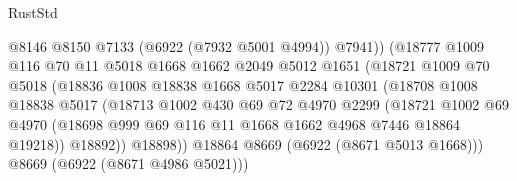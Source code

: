 \begin{lexlean}{RustStd}
\begin{coremodule}
                                  @8146
                                  @8150
                                  @7133
                                  (@6922 (@7932 @5001 @4994))
                                  @7941))
                              (@18777
                                @1009
                                @116
                                @70
                                @11
                                @5018
                                @1668
                                @1662
                                @2049
                                @5012
                                @1651
                                (@18721
                                  @1009
                                  @70
                                  @5018
                                  (@18836
                                    @1008
                                    @18838
                                    @1668
                                    @5017
                                    @2284
                                    @10301
                                    (@18708
                                      @1008
                                      @18838
                                      @5017
                                      (@18713
                                        @1002
                                        @430
                                        @69
                                        @72
                                        @4970
                                        @2299
                                        (@18721
                                          @1002
                                          @69
                                          @4970
                                          (@18698
                                            @999
                                            @69
                                            @116
                                            @11
                                            @1668
                                            @1662
                                            @4968
                                            @7446
                                            @18864
                                            @19218))
                                        @18892))
                                    @18898))
                                @18864
                                @8669
                                (@6922 (@8671 @5013 @1668)))
                              @8669
                              (@6922 (@8671 @4986 @5021)))

\end{coremodule}
\end{lexlean}

